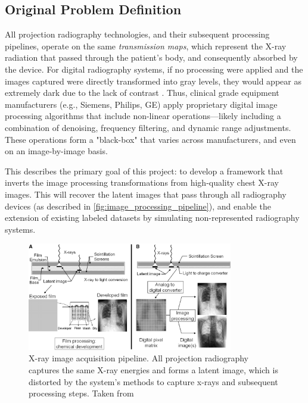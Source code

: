 \documentclass[nomenclature, english, bibtex]{kththesis}
\numberwithin{listing}{chapter}
\begin{document}
\subsection{Original Problem Definition}

All projection radiography technologies, and their subsequent processing pipelines, operate on the same
\textit{transmission maps}, which represent the X-ray radiation that passed through the patient's body, and consequently
absorbed by the device. For digital radiography systems, if no processing were applied and the images captured were directly transformed
into gray levels, they would appear as extremely dark due to the lack of contrast \cite[p.~148]{Prokop2003}.
Thus, clinical grade equipment manufacturers (e.g., Siemens, Philips, GE) apply proprietary digital image processing
algorithms that include non-linear operations—likely including a combination of denoising, frequency filtering,
and dynamic range adjustments. These operations form a "black-box" that varies across manufacturers, and even on an
image-by-image basis.

This describes the primary goal of this project: to develop a framework that inverts the image processing transformations
from high-quality chest X-ray images. This will recover the latent images that pass through all radiography devices (as
described in \autoref{fig:image_processing_pipeline}), and enable the extension of existing labeled datasets by simulating
non-represented radiography systems.

\begin{figure}
    \centering
    \includegraphics[width=0.8\textwidth]{figures/latent_image.jpg}
    \caption{X-ray image acquisition pipeline. All projection radiography captures the same X-ray energies and
   forms a latent image, which is distorted by the system's methods to capture x-rays and subsequent processing steps.
    Taken from \cite[p.~13]{Seibert3}}
    \label{fig:image_processing_pipeline}
\end{figure}
\end{document}
